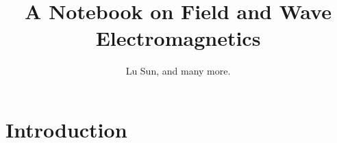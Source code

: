 

\makeindex


	
	\frontmatter
	
	\title{A Notebook on Field and Wave Electromagnetics}
	\author{Lu Sun, and many more.}
	
	\maketitle
	
	
	\tableofcontents
	
	
	\listoffigures
	\listoftables
	
	\mainmatter
	
	\part{Introduction}
	
	\appendix
	
	
	
	
	\printindex
	

